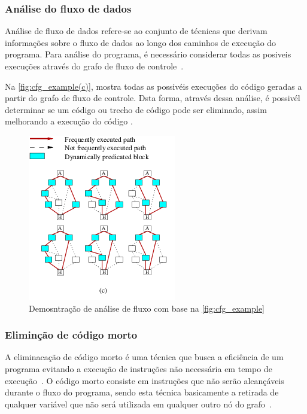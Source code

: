 \subsubsection{Análise do fluxo de dados}
\par
Análise de fluxo de dados refere-se ao conjunto de técnicas que derivam informações sobre o fluxo de dados ao longo dos caminhos de execução do programa. Para análise do programa, é necessário considerar todas as posiveis execuções através do grafo de fluxo de controle~\cite{aho2007compilers}.

\par
Na \autoref{fig:cfg_example(c)}, mostra todas as possivéis execuções do código geradas a partir do grafo de fluxo de controle. Dsta forma, através dessa análise, é possivél determinar se um código ou trecho de código pode ser eliminado, assim melhorando a execução do código \cite{aho2007compilers}.

\begin{figure}[H]
	\begin{center}
    \caption{\label{fig:cfg_example(c)}Demosntração de análise de fluxo com base na \autoref{fig:cfg_example}}
	\includegraphics[scale=0.85]{Figuras/cfg_example(c).png}
	\end{center}
\end{figure}
\subsubsection{Eliminção de código morto}

A eliminacação de código morto é uma técnica que busca a eficiência de um programa evitando a execução de instruções não necessária em tempo de execução~\cite{knoop1994partial}. O código morto consiste em instruções que não serão alcançáveis durante o fluxo do programa, sendo esta técnica basicamente a  retirada de qualquer variável que não será utilizada em qualquer outro nó do grafo~\cite{aho2007compilers}.

